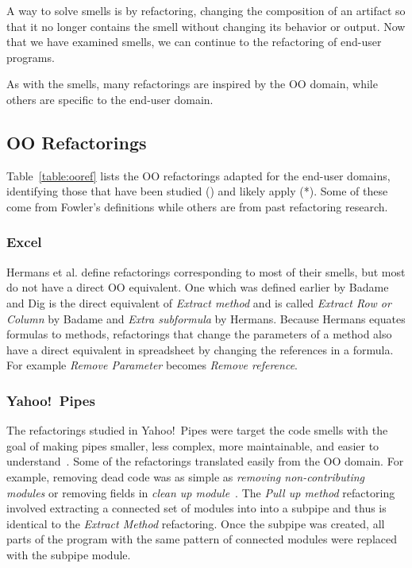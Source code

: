 \documentclass[10pt,conference,compsocconf]{IEEEtran}
\begin{document}
A way to solve smells is by refactoring, changing the composition of an artifact so that it no longer contains the smell without changing its behavior or output.
Now that we have examined smells, we can continue to the refactoring of end-user programs.

As with the smells, many refactorings are inspired by the OO domain, while others are specific to the end-user domain. 

\subsection{OO Refactorings}
Table~\ref{table:ooref} lists the OO refactorings adapted for the end-user domains, identifying those that have been studied () and likely apply (*).
Some of these come from Fowler's definitions while others are from past refactoring research. 

\subsubsection{Excel}

Hermans et al. \cite{Hermans2012intraExt} define refactorings corresponding to most of their smells, but most do not have a direct OO equivalent.
One which was defined earlier by Badame and Dig \cite{badame2012refactoring} is the direct equivalent of \emph{Extract method} and is called \emph{Extract Row or Column} by Badame and \emph{Extra subformula} by Hermans.
Because Hermans equates formulas to methods, refactorings that change the parameters of a method also have a direct equivalent in spreadsheet by changing the references in a formula. For example \emph{Remove Parameter} becomes \emph{Remove reference}.
 
\subsubsection{Yahoo!\ Pipes}
The refactorings studied in Yahoo!\ Pipes were target the code smells with the goal of making pipes smaller, less complex, more maintainable, and easier to understand~\cite{StoleeTSE2013}.
Some of the refactorings translated easily from the OO domain. For example, removing dead code was as simple as \emph{removing non-contributing modules} or removing fields in \emph{clean up module}~\cite{StoleeTSE2013}.
The \emph{Pull up method} refactoring involved extracting a connected set of modules into into a subpipe and thus is identical to the \emph{Extract Method} refactoring.
Once the subpipe was created, all  parts of the program with the same pattern of connected modules were replaced with the subpipe module. 
\end{document}

